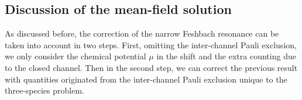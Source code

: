 \documentclass[reprint,pra]{revtex4-1}
\newcommand{\vk}{\ensuremath{\mathbf{k}}}
\newcommand{\nth}[1]{\ensuremath{\frac{1}{#1}}}
\newcommand{\mbr}[1]{\ensuremath{\left[#1\right]}}
\begin{document}
%
%
%
%  
%  
%  
%  
%
\subsection{Discussion of the mean-field solution\label{sec:pathInt2:mean2}}
As discussed before, the correction of the narrow Feshbach resonance can be taken into account in two steps.  First,  omitting the inter-channel Pauli exclusion, we only consider the chemical potential $\mu$ in the shift and  the extra counting due to the closed channel.  Then in the second step, we can correct the previous result with quantities originated from the inter-channel Pauli exclusion unique to the three-species problem. 
\end{document}
